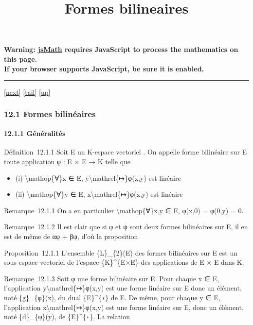 \documentclass[]{article}
\title{Formes bilineaires}
\author{}
\date{}
\begin{document}
\maketitle

\textbf{Warning: \href{http://www.math.union.edu/locate/jsMath}{jsMath}
requires JavaScript to process the mathematics on this page.\\ If your
browser supports JavaScript, be sure it is enabled.}

\begin{center}\rule{3in}{0.4pt}\end{center}

{[}\href{coursse68.html}{next}{]}
{[}\hyperref[tailcoursse67.html]{tail}{]}
{[}\href{coursch13.html\#coursse67.html}{up}{]}

\subsubsection{12.1 Formes bilinéaires}

\paragraph{12.1.1 Généralités}

Définition~12.1.1 Soit E un K-espace vectoriel . On appelle forme
bilinéaire sur E toute application φ : E × E → K telle que

\begin{itemize}
\itemsep1pt\parskip0pt
\item
  (i) \textbackslash{}mathop\{∀\}x ∈ E,
  y\textbackslash{}mathrel\{↦\}φ(x,y) est linéaire
\item
  (ii) \textbackslash{}mathop\{∀\}y ∈ E,
  x\textbackslash{}mathrel\{↦\}φ(x,y) est linéaire
\end{itemize}

Remarque~12.1.1 On a en particulier \textbackslash{}mathop\{∀\}x,y ∈ E,
φ(x,0) = φ(0,y) = 0.

Remarque~12.1.2 Il est clair que si φ et ψ sont deux formes bilinéaires
sur E, il en est de même de αφ + βψ, d'où la proposition

Proposition~12.1.1 L'ensemble \{L\}\_\{2\}(E) des formes bilinéaires sur
E est un sous-espace vectoriel de l'espace \{K\}\^{}\{E×E\} des
applications de E × E dans K.

Remarque~12.1.3 Soit φ une forme bilinéaire sur E. Pour chaque x ∈ E,
l'application y\textbackslash{}mathrel\{↦\}φ(x,y) est une forme linéaire
sur E donc un élément, noté \{g\}\_\{φ\}(x), du dual \{E\}\^{}\{∗\} de
E. De même, pour chaque y ∈ E, l'application
x\textbackslash{}mathrel\{↦\}φ(x,y) est une forme linéaire sur E, donc
un élément, noté \{d\}\_\{φ\}(y), de \{E\}\^{}\{∗\}. La relation
\end{document}
